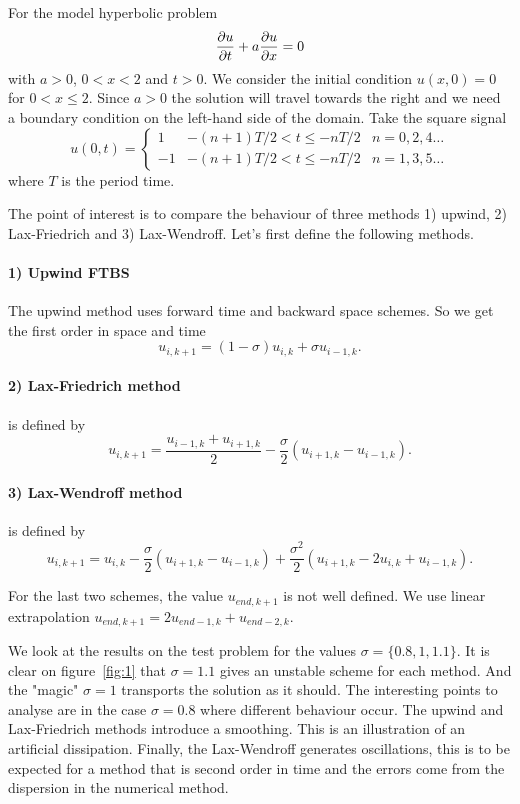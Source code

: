 
For the model hyperbolic problem 
\begin{equation}
\dfrac{\partial u}{\partial t}+a\dfrac{\partial u}{\partial x}=0
\end{equation}
with $a>0$, $0<x<2$ and $t>0$. We consider the initial condition $u(x,0)=0$ for $0<x\leq 2$. Since $a>0$ the solution will travel towards the right and we need a boundary condition on the left-hand side of the domain. Take the square signal 
$$
u(0,t)=\left\{\begin{array}{lcc}
1 & -(n+1)T/2<t\leq -nT/2 & n = 0,2,4\dots\\
-1 & -(n+1)T/2<t\leq -nT/2 & n = 1,3,5\dots
\end{array}\right.
$$
where $T$ is the period time.

The point of interest is to compare the behaviour of three methods 1) upwind, 2) Lax-Friedrich
and 3) Lax-Wendroff. Let's first define the following methods.

\paragraph*{1) Upwind FTBS} The upwind method uses forward time and backward space schemes. So we get the first order in space and time 
$$u_{i,k+1}=(1-\sigma)u_{i,k}+\sigma u_{i-1,k}.$$ 


\paragraph*{2) Lax-Friedrich method} is defined by 
$$u_{i,k+1} = \dfrac{u_{i-1,k}+u_{i+1,k}}{2}-\dfrac{\sigma}{2}(u_{i+1,k}-u_{i-1,k}).$$

\paragraph*{3) Lax-Wendroff method} is defined by 
$$u_{i,k+1} = u_{i,k} -\dfrac{\sigma}{2}(u_{i+1,k}-u_{i-1,k}) +\dfrac{\sigma^2}{2}(u_{i+1,k}-2u_{i,k}+u_{i-1,k}).$$

For the last two schemes, the value $u_{end,k+1}$ is not well defined. We use linear extrapolation $u_{end,k+1} = 2u_{end-1,k}+u_{end-2,k}$.

We look at the results on the test problem for the values $\sigma = \{0.8, 1, 1.1\}$. It is clear on figure~\ref{fig:1} that $\sigma=1.1$ gives an unstable scheme for each method. And the "magic" $\sigma=1$ transports the solution as it should. The interesting points to analyse are in the case $\sigma=0.8$ where different behaviour occur. The upwind and Lax-Friedrich methods introduce a smoothing. This is an illustration of an artificial dissipation. Finally, the Lax-Wendroff generates oscillations, this is to be expected for a method that is second order in time and the errors come from the dispersion in the numerical method.

